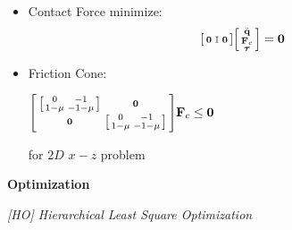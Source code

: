 \documentclass[landscape,a0paper,fontscale=0.285]{baposter} %
\renewenvironment{bmatrix}{\left[\begin{smallmatrix}}{\end{smallmatrix}\right]}
\begin{document}
\begin{poster}
{\begin{itemize}
    \item Contact Force minimize: 
        \[
        \begin{bmatrix}\mathbf{0} & \mathbb{I} & \mathbf{0}\end{bmatrix}\begin{bmatrix}\ddot{\mathbf{q}} \\ \mathbf{F}_c \\ \boldsymbol{\tau}\end{bmatrix} = \mathbf{0}
        \]
    \item Friction Cone: 
    
    $\begin{bmatrix}\begin{bmatrix}0 & -1 \\ 1 - \mu & -1 - \mu\end{bmatrix} & \mathbf{0} \\ \mathbf{0} & \begin{bmatrix}0 & -1 \\ 1 - \mu & -1 - \mu\end{bmatrix}\end{bmatrix}  \mathbf{F}_c  \le \mathbf{0}$ 
    
    for $2D$ $x-z$ problem
\end{itemize}

\textbf{Optimization}

\textit{[HO] Hierarchical Least Square Optimization}




}


\end{poster}
\end{document}
